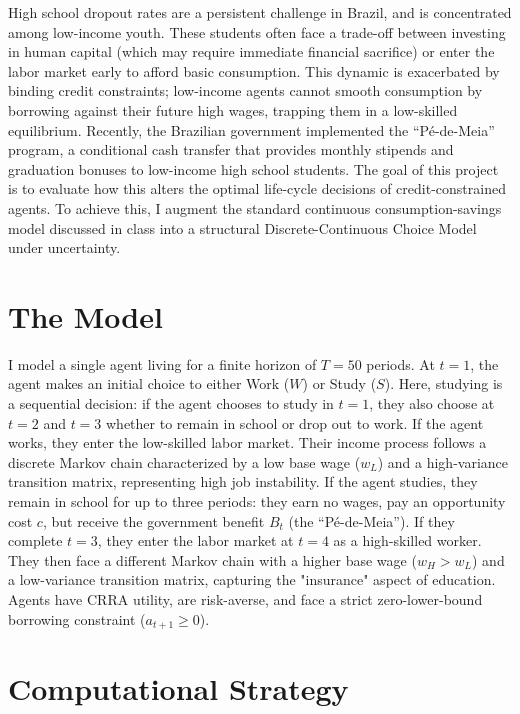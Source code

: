\documentclass[11pt]{article}
\numberwithin{equation}{section}
\numberwithin{figure}{section}
\begin{document}
High school dropout rates are a persistent challenge in Brazil, and is concentrated among low-income youth. These students often face a trade-off between investing in human capital (which may require immediate financial sacrifice) or enter the labor market early to afford basic consumption. This dynamic is exacerbated by binding credit constraints; low-income agents cannot smooth consumption by borrowing against their future high wages, trapping them in a low-skilled equilibrium. Recently, the Brazilian government implemented the ``Pé-de-Meia'' program, a conditional cash transfer that provides monthly stipends and graduation bonuses to low-income high school students. The goal of this project is to evaluate how this alters the optimal life-cycle decisions of credit-constrained agents. To achieve this, I augment the standard continuous consumption-savings model discussed in class into a structural Discrete-Continuous Choice Model under uncertainty.

\vspace{-0.3cm}

\section{The Model}

I model a single agent living for a finite horizon of $T=50$ periods. At $t=1$, the agent makes an initial choice to either Work ($W$) or Study ($S$). Here, studying is a sequential decision: if the agent chooses to study in $t=1$, they also choose at $t=2$ and $t=3$ whether to remain in school or drop out to work. If the agent works, they enter the low-skilled labor market. Their income process follows a discrete Markov chain characterized by a low base wage ($w_L$) and a high-variance transition matrix, representing high job instability. If the agent studies, they remain in school for up to three periods: they earn no wages, pay an opportunity cost $c$, but receive the government benefit $B_t$ (the ``Pé-de-Meia''). If they complete $t=3$, they enter the labor market at $t=4$ as a high-skilled worker. They then face a different Markov chain with a higher base wage ($w_H > w_L$) and a low-variance transition matrix, capturing the "insurance" aspect of education. Agents have CRRA utility, are risk-averse, and face a strict zero-lower-bound borrowing constraint ($a_{t+1} \ge 0$).

\vspace{-0.3cm}

\section{Computational Strategy}
\end{document}
